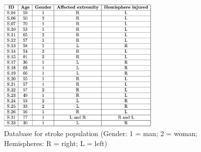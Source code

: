 \begin{figure}[ht]
    \centering
    \includegraphics[width=0.70\textwidth]{appendix/database_stroke.png}
    \caption{Database for stroke population (Gender: 1 = man; 2 = woman; Hemispheres: R = right; L = left) }
    \label{fig: Database stroke}
\end{figure}

\clearpage


